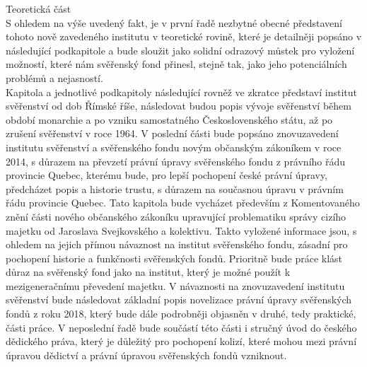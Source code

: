\documentclass{article}
\begin{document}


{\Large Teoretická část}\\

S ohledem na výše uvedený fakt, je v první řadě nezbytné obecné představení tohoto nově zavedeného institutu v teoretické rovině, které je detailněji popsáno v následující podkapitole a bude sloužit jako solidní odrazový můstek pro vylož\-ení možností, které nám svěřenský fond přinesl, stejně tak, jako jeho potenciálních problémů a nejasností. \\

Kapitola a jednotlivé podkapitoly následující rovněž ve zkratce představí institut svěřenství od dob Římské říše, následovat budou popis vývoje svěřenství během období monarchie a po vzniku samostatného Československého státu, až po zrušení svěřenství v roce 1964. V poslední části bude popsáno znovuzavedení institutu svěřenství a svěřenského fondu novým občanským zá\-koníkem v roce 2014, s důrazem na převzetí právní úpravy svěřenského fondu z právního řádu provincie Quebec, kterému bude, pro lepší pochopení české právní úpravy, předcházet popis a historie trustu, s důrazem na současnou úpravu v právním řádu provincie Quebec. Tato kapitola bude vycházet především z Komentovaného znění části nového občanského zákoníku upravující problematiku správy cizího majetku od Jaroslava Svejkovského a kolektivu. Takto vyložené informace jsou, s ohledem na jejich přímou návaznost na institut svěřenského fondu, zásadní pro pochopení historie a funkčnosti svěřenských fondů. Prioritně bude práce klást důraz na svěřenský fond jako na institut, který je možné použít k mezigeneračnímu převedení majetku. V návaznosti na znovuzavedení institutu svěřenství bude následovat základní popis novelizace právní úpravy svěřenských fondů z roku 2018, který bude dále podrobněji objasněn v druhé, tedy praktické, části práce. V neposlední řadě bude součástí této části i stručný úvod do českého dědického práva, který je důležitý pro pochopení kolizí, které mohou mezi právní úpravou dědictví a právní úpravou svěřenských fondů vzniknout.\\

\end{document}
